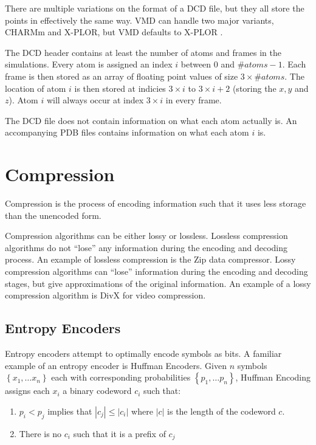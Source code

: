 \documentclass{report}
\begin{document}
There are multiple variations on the format of a DCD file, but they all store
the points in effectively the same way. VMD can handle two major variants,
CHARMm and X-PLOR, but VMD defaults to X-PLOR \citep{vmddcdformat}.

The DCD header contains at least the number of atoms and frames in the
simulations. Every atom is assigned an index $i$ between $0$ and $\#atoms -
1$. Each frame is then stored as an array of floating point values of size $3
\times \#atoms$. The location of atom $i$ is then stored at indicies $3 \times
i$ to $3 \times i + 2$ (storing the $x, y$ and $z$). Atom $i$ will always
occur at index $3 \times i$ in every frame.

The DCD file does not contain information on what each atom actually is. An
accompanying PDB files contains information on what each atom $i$ is.


\section{Compression}

Compression is the process of encoding information such that it uses less
storage than the unencoded form.

Compression algorithms can be either lossy or lossless. Lossless compression
algorithms do not ``lose'' any information during the encoding and decoding
process. An example of lossless compression is the Zip data compressor. Lossy
compression algorithms can ``lose'' information during the encoding and
decoding stages, but give approximations of the original information. An
example of a lossy compression algorithm is DivX for video compression.

\subsection{Entropy Encoders}

Entropy encoders attempt to optimally encode symbols as bits. A familiar
example of an entropy encoder is Huffman Encoders. Given $n$ symbols
$\left\{x_1, \dots x_n \right\}$ each with corresponding probabilities
$\left\{p_1, \dots p_n \right\}$, Huffman Encoding assigns each $x_i$ a binary
codeword $c_i$ such that:
\begin{enumerate}
  \item $p_i < p_j$ implies that $|c_j| \le |c_i|$ where $|c|$ is the length
    of the codeword $c$.
  \item There is no $c_i$ such that it is a prefix of $c_j$
\end{enumerate}
\citep{huffman1952method}
\end{document}
